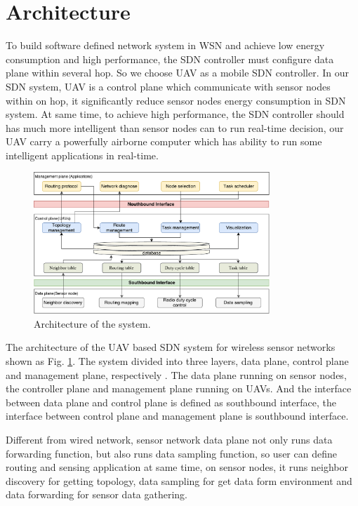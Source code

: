 \newpage
\section{Architecture}
\label{Arc}



To build software defined network system in WSN and achieve low energy consumption and high performance, the SDN controller must 
configure data plane within several hop. So we choose UAV as a mobile SDN controller. In our SDN system, UAV is a control plane which communicate with sensor nodes within on hop, it significantly reduce
 sensor nodes energy consumption in SDN system. At same time, to achieve high performance, the SDN controller should has much more intelligent than sensor nodes can to run real-time decision, our UAV carry 
 a powerfully airborne computer which has ability to run some intelligent applications in real-time.
 


\begin{figure}[htbp]
	\centering
	\includegraphics[width=3.5in]{./Figure/Architecture}
	\caption{Architecture of the system.}
	\label{Architecture}
\end{figure}
The architecture of the UAV based SDN system for wireless sensor networks shown as Fig. \ref{Architecture}. The system divided into three layers, data plane, control plane and management plane, respectively
. The data plane running on sensor nodes, the controller plane and management plane running on UAVs. And the interface between data plane and control plane is defined as southbound interface,
 the interface between control plane and management plane is southbound interface.

Different from wired network, sensor network data plane not only runs data forwarding function, but also runs data sampling function, so user can define routing and sensing application at same time, on sensor nodes, 
it runs neighbor discovery for getting topology, data sampling for get data form environment and data forwarding for sensor data gathering.

